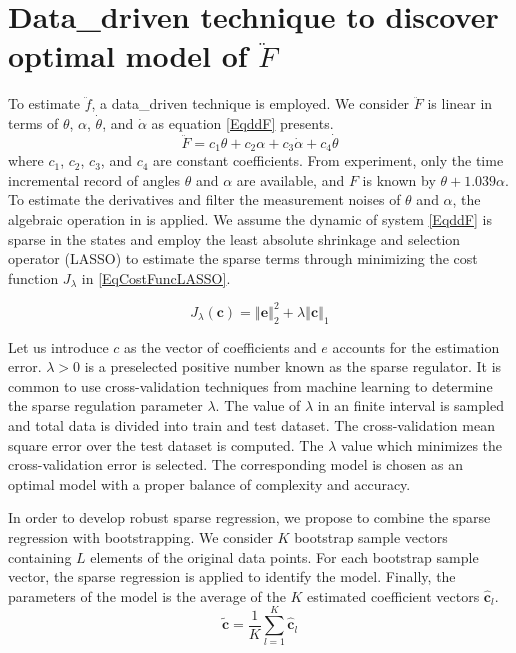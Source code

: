 \documentclass[letterpaper,12pt]{article}
\begin{document}
\section{Data\_driven technique to discover optimal model of $\ddot{F}$}

To estimate $\ddot{f}$, a data\_driven technique is employed. We consider $\ddot{F}$ is linear in terms of $\theta$, $ \alpha$, $\dot{\theta}$, and $\dot{\alpha}$ as equation \ref{EqddF} presents. 
\begin{equation}\label{EqddF}
\ddot{F}=c_{1} \theta+c_{2} \alpha+c_{3} \dot{\alpha} + c_{4} \dot{\theta} 
\end{equation}
where $c_{1}$, $c_{2}$, $c_{3}$, and $c_{4}$ are constant coefficients. From experiment, only the time incremental record of angles $\theta$ and $\alpha$ are available, and $F$ is known by $\theta+1.039\alpha$. To estimate the derivatives and filter the measurement noises of $\theta$ and $\alpha$, the algebraic operation in \cite{FliessRamirez2003} is applied.  We assume the dynamic of system \ref{EqddF} is sparse in the states and employ the least absolute shrinkage and selection operator (LASSO) to estimate the sparse terms through minimizing the cost function $J_{\lambda}$ in \ref{EqCostFuncLASSO}. 

\begin{equation}\label{EqCostFuncLASSO}
J_{\lambda}(\mathbf{c}) =\left\Vert \mathbf{e}\right\Vert _{2}^{2}+\lambda\left\Vert \mathbf{c}\right\Vert _{1}
\end{equation}

Let us introduce $c$ as the vector of coefficients and $e$ accounts for the estimation error. $\lambda > 0$ is a preselected positive number known as the sparse regulator. It is common to use cross-validation techniques from machine learning to determine the sparse regulation parameter $\lambda$. The value of $\lambda$ in an finite interval is sampled and total data is divided into train and test dataset. The cross-validation mean square error over the test dataset is computed. The $\lambda$ value which minimizes the cross-validation error is selected. The corresponding model is chosen as an optimal model with a proper balance of complexity and accuracy.

In order to develop robust sparse regression, we propose to combine the sparse regression with bootstrapping. We consider $K$
bootstrap sample vectors containing $L$ elements of the original data points. For
each bootstrap sample vector, the sparse regression is applied to identify the
model. Finally, the parameters of the model is the average of the $K$
estimated coefficient vectors $\hat{\mathbf{c}}_{l}$.%
\begin{equation}
\tilde{\mathbf{c}}=\frac{1}{K}{\sum_{l=1}^{K}}\hat{\mathbf{c}}_{l}
\label{EqBootsrapping}%
\end{equation}
\end{document}
